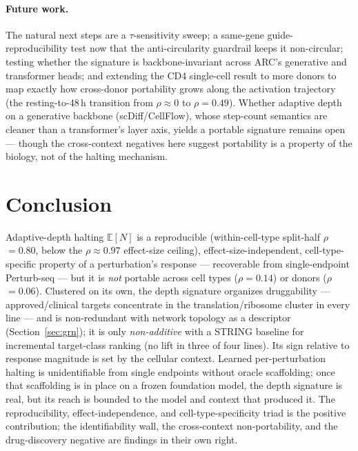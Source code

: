 \documentclass[11pt]{article}
\newcommand{\EN}{\ensuremath{\mathbb{E}[N]}}
\let\mathrho\rho
\renewcommand{\rho}{\ensuremath{\mathrho}}
\begin{document}
\paragraph{Future work.} The natural next steps are a $\tau$-sensitivity sweep; a same-gene
guide-reproducibility test now that the anti-circularity guardrail keeps it non-circular; testing
whether the signature is backbone-invariant across ARC's generative and transformer heads; and
extending the CD4 single-cell result to more donors to map exactly how cross-donor portability
grows along the activation trajectory (the resting-to-48\,h transition from \rho{}$\approx0$ to
\rho{}$=0.49$). Whether adaptive depth on a generative backbone (scDiff/CellFlow), whose step-count
semantics are cleaner than a transformer's layer axis, yields a portable signature remains open ---
though the cross-context negatives here suggest portability is a property of the biology, not of
the halting mechanism.

\section{Conclusion}

Adaptive-depth halting \EN{} is a reproducible (within-cell-type split-half \rho{}$=0.80$, below
the \rho{}$\approx0.97$ effect-size ceiling), effect-size-independent, cell-type-specific property
of a perturbation's response --- recoverable from single-endpoint Perturb-seq --- but it is
\emph{not} portable across cell types (\rho{}$=0.14$) or donors (\rho{}$=0.06$). Clustered on its own, the depth signature organizes
druggability --- approved/clinical targets concentrate in the translation/ribosome cluster in every
line --- and is non-redundant with network topology as a descriptor (Section~\ref{sec:grn}); it is
only \emph{non-additive} with a STRING baseline for incremental target-class ranking (no lift in
three of four lines). Its sign relative to response magnitude is
set by the cellular context.
Learned per-perturbation halting is unidentifiable from single endpoints without oracle
scaffolding; once that scaffolding is in place on a frozen foundation model, the depth signature
is real, but its reach is bounded to the model and context that produced it. The reproducibility,
effect-independence, and cell-type-specificity triad is the positive contribution; the
identifiability wall, the cross-context non-portability, and the drug-discovery negative are
findings in their own right.
\end{document}
